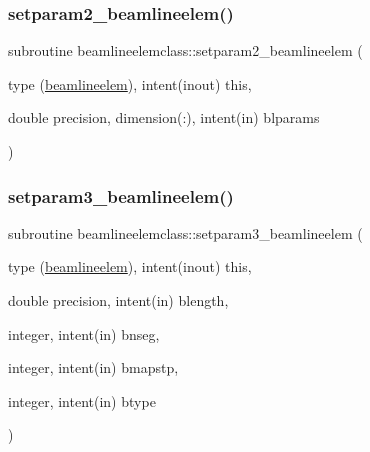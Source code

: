 \subsubsection{\texorpdfstring{setparam2\_beamlineelem()}{setparam2\_beamlineelem()}}
{\footnotesize\ttfamily subroutine beamlineelemclass\+::setparam2\+\_\+beamlineelem (\begin{DoxyParamCaption}\item[{type (\mbox{\hyperlink{namespacebeamlineelemclass_structbeamlineelemclass_1_1beamlineelem}{beamlineelem}}), intent(inout)}]{this,  }\item[{double precision, dimension(\+:), intent(in)}]{blparams }\end{DoxyParamCaption})}

\mbox{\label{namespacebeamlineelemclass_a604cc75bca5926a1918df8c19454e41e}} 
\subsubsection{\texorpdfstring{setparam3\_beamlineelem()}{setparam3\_beamlineelem()}}
{\footnotesize\ttfamily subroutine beamlineelemclass\+::setparam3\+\_\+beamlineelem (\begin{DoxyParamCaption}\item[{type (\mbox{\hyperlink{namespacebeamlineelemclass_structbeamlineelemclass_1_1beamlineelem}{beamlineelem}}), intent(inout)}]{this,  }\item[{double precision, intent(in)}]{blength,  }\item[{integer, intent(in)}]{bnseg,  }\item[{integer, intent(in)}]{bmapstp,  }\item[{integer, intent(in)}]{btype }\end{DoxyParamCaption})}

